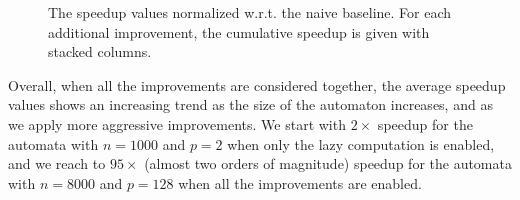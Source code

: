 \documentclass[12pt]{article}
\newcommand{\comment}[2]{{\color{red}{\bf (#1: #2)}}}
\begin{document}
\begin{figure}[ht]
	\centering
	\caption{The speedup values normalized w.r.t. the naive baseline. For each additional improvement, the cumulative speedup is given with stacked columns.\comment{sertac}{n=1000 kalsin mi?}}
	\label{fig:speedups}
\end{figure}

Overall, when all the improvements are considered together, the average speedup values shows an increasing trend as the size of the automaton increases, and as we apply more aggressive improvements. We start with $2\times$ speedup for the automata with $n=1000$ and $p=2$ when only the lazy computation is enabled, and we reach to $95\times$ (almost two orders of magnitude) speedup for the automata with $n=8000$ and $p=128$ when all the improvements are enabled.\comment{sertac}{n=1000}
\end{document}
